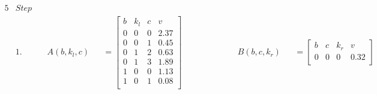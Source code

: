 \begin{figure}[H]
    \begin{alignat*}{5}
         & Step \ &              &                &                                                                                      &                                                                                                       &  &  &  & \\
         & 1.          &              & A(b, k_l, c)   &                                                                                      & = \begin{bmatrix}
                                                                                                                                                      b & k_l & c & v    \\
                                                                                                                                                      0 & 0   & 0 & 2.37 \\
                                                                                                                                                      0 & 0   & 1 & 0.45 \\
                                                                                                                                                      0 & 1   & 2 & 0.63 \\
                                                                                                                                                      0 & 1   & 3 & 1.89 \\
                                                                                                                                                      1 & 0   & 0 & 1.13 \\
                                                                                                                                                      1 & 0   & 1 & 0.08 \\
                                                                                                                                                  \end{bmatrix} \qquad
         &             & \qquad \quad B(b, c, k_r) &                & = \begin{bmatrix}
                                                               b & c & k_r & v    \\
                                                               0 & 0 & 0   & 0.32 \\

\end{bmatrix}
\end{alignat*}
\end{figure}
